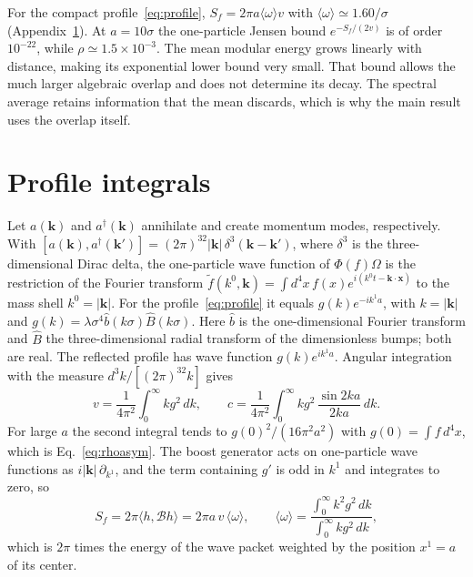 \documentclass[11pt,a4paper]{article}
\begin{document}
For the compact profile~\eqref{eq:profile}, $S_f=2\pi a\langle\omega\rangle v$ with $\langle\omega\rangle\simeq1.60/\sigma$ (Appendix~\ref{app:profile}). At $a=10\sigma$ the one-particle Jensen bound $e^{-S_f/(2v)}$ is of order $10^{-22}$, while $\rho\simeq1.5\times10^{-3}$. The mean modular energy grows linearly with distance, making its exponential lower bound very small. That bound allows the much larger algebraic overlap and does not determine its decay. The spectral average retains information that the mean discards, which is why the main result uses the overlap itself.

\section{Profile integrals}
\label{app:profile}

Let $a(\bm k)$ and $a^\dagger(\bm k)$ annihilate and create momentum modes, respectively. With $[a(\bm k),a^\dagger(\bm k')]=(2\pi)^32|\bm k|\,\delta^3(\bm k-\bm k')$, where $\delta^3$ is the three-dimensional Dirac delta, the one-particle wave function of $\Phi(f)\Omega$ is the restriction of the Fourier transform $\tilde f(k^0,\bm k)=\int d^4x\,f(x)e^{i(k^0t-\bm k\cdot\bm x)}$ to the mass shell $k^0=|\bm k|$. For the profile~\eqref{eq:profile} it equals $g(k)e^{-ik^1a}$, with $k=|\bm k|$ and $g(k)=\lambda\sigma^4\hat b(k\sigma)\hat B(k\sigma)$. Here $\hat b$ is the one-dimensional Fourier transform and $\hat B$ the three-dimensional radial transform of the dimensionless bumps; both are real. The reflected profile has wave function $g(k)e^{ik^1a}$. Angular integration with the measure $d^3k/[(2\pi)^32k]$ gives
\begin{equation}
 v=\frac{1}{4\pi^2}\int_0^\infty kg^2\,dk,\qquad
 c=\frac{1}{4\pi^2}\int_0^\infty kg^2\,\frac{\sin2ka}{2ka}\,dk .
\end{equation}
For large $a$ the second integral tends to $g(0)^2/(16\pi^2a^2)$ with $g(0)=\int f\,d^4x$, which is Eq.~\eqref{eq:rhoasym}. The boost generator acts on one-particle wave functions as $i|\bm k|\,\partial_{k^1}$, and the term containing $g'$ is odd in $k^1$ and integrates to zero, so
\begin{equation}
 S_f=2\pi\langle h,\mathcal Bh\rangle=2\pi a\,v\,\langle\omega\rangle,\qquad
 \langle\omega\rangle=\frac{\int_0^\infty k^2g^2\,dk}{\int_0^\infty kg^2\,dk},
\end{equation}
which is $2\pi$ times the energy of the wave packet weighted by the position $x^1=a$ of its center.
\end{document}
